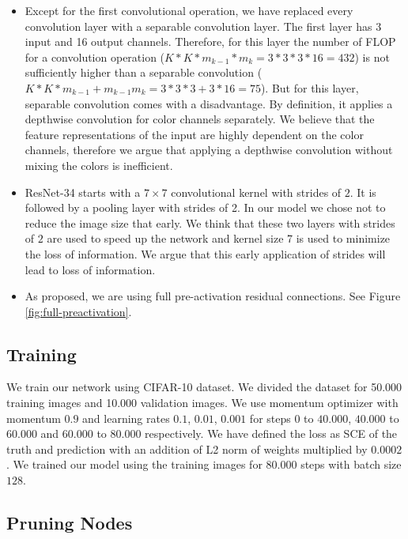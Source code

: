 \begin{itemize}
\item Except for the first convolutional operation, we have replaced every convolution layer with a separable convolution layer. The first layer has 3 input and 16 output channels. Therefore, for this layer the number of FLOP for a convolution operation ($K*K*m_{k-1}*m_k = 3*3*3*16 = 432$) is not sufficiently higher than a separable convolution ($K*K*m_{k-1} + m_{k-1}m_k = 3*3*3 + 3*16=75$). But for this layer, separable convolution comes with a disadvantage. By definition, it applies a depthwise convolution for color channels separately. We believe that the feature representations of the input are highly dependent on the color channels, therefore we argue that applying a depthwise convolution without mixing the colors is inefficient.
\item ResNet-34 starts with a $7 \times 7$ convolutional kernel with strides of $2$. It is followed by a pooling layer with strides of 2. In our model we chose not to reduce the image size that early. We think that these two layers with strides of $2$ are used to speed up the network and kernel size 7 is used to minimize the loss of information. We argue that this early application of strides will lead to loss of information. 
\item As \cite{he2016identity} proposed, we are using full pre-activation residual connections. See Figure \ref{fig:full-preactivation}.
\end{itemize}

\subsection{Training}
We train our network using CIFAR-10 dataset. We divided the dataset for 50.000 training images and 10.000 validation images. We use momentum optimizer with momentum $0.9$ and learning rates $0.1$, $0.01$, $0.001$ for steps $0$ to $40.000$, $40.000$ to $60.000$ and $60.000$ to $80.000$ respectively. We have defined the loss as SCE of the truth and prediction with an addition of L2 norm of weights multiplied by $0.0002$. We trained our model using the training images for $80.000$ steps with batch size $128$. 

\subsection{Pruning Nodes}

